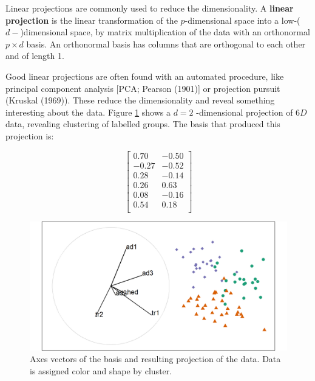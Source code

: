 \documentclass[
  11,
]{article}
\begin{document}
Linear projections are commonly used to reduce the dimensionality. A \textbf{linear projection} is the linear transformation of the \(p\)-dimensional space into a low-(\(d-\))dimensional space, by matrix multiplication of the data with an orthonormal \(p\times d\) basis. An orthonormal basis has columns that are orthogonal to each other and of length 1.

Good linear projections are often found with an automated procedure, like principal component analysis {[}PCA; Pearson (1901){]} or projection pursuit (Kruskal (1969)). These reduce the dimensionality and reveal something interesting about the data. Figure \ref{fig:basis} shows a \(d = 2\) -dimensional projection of \(6D\) data, revealing clustering of labelled groups. The basis that produced this projection is:

\begin{equation*}
\left[ \begin{array}{rr}
  0.70 & -0.50 \\
 -0.27 & -0.52 \\
  0.28 & -0.14 \\
  0.26 &  0.63 \\
  0.08 & -0.16 \\
  0.54 &  0.18 \\
\end{array} \right]
\end{equation*}

\begin{figure}[h]

{\centering \includegraphics[width=1\linewidth,]{./figures/basis} 

}

\caption{Axes vectors of the basis and resulting projection of the data. Data is assigned color and shape by cluster.}\label{fig:basis}
\end{figure}
\end{document}
